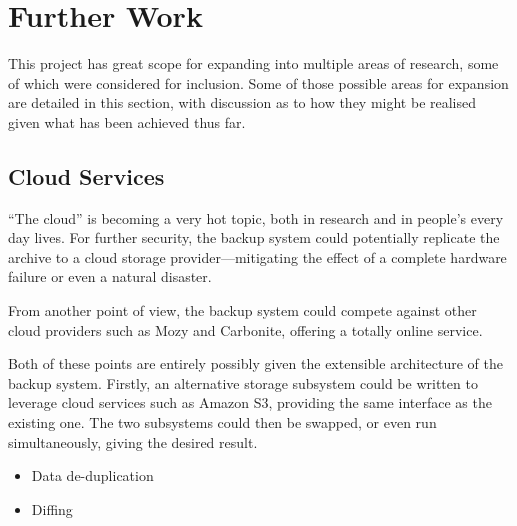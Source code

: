 \chapter{Further Work}
\label{chap:further-work}

This project has great scope for expanding into multiple areas of research,
some of which were considered for inclusion. Some of those possible areas for
expansion are detailed in this section, with discussion as to how they might be
realised given what has been achieved thus far.

\section{Cloud Services}

``The cloud'' is becoming a very hot topic, both in research and in people's
every day lives. For further security, the backup system could potentially
replicate the archive to a cloud storage provider---mitigating the effect of
a complete hardware failure or even a natural disaster.

From another point of view, the backup system could compete against other cloud
providers such as Mozy and Carbonite, offering a totally online service.

Both of these points are entirely possibly given the extensible architecture of
the backup system. Firstly, an alternative storage subsystem could be written
to leverage cloud services such as Amazon S3, providing the same interface as
the existing one. The two subsystems could then be swapped, or even run
simultaneously, giving the desired result.

\begin{itemize}
    \item Data de-duplication
    \item Diffing
\end{itemize}
